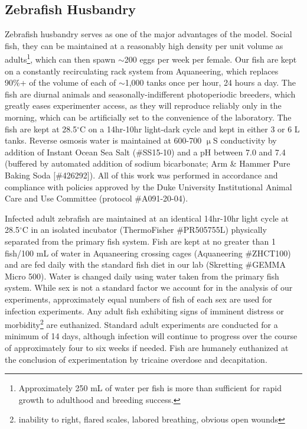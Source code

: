 \subsection{Zebrafish Husbandry}\label{husbandry}

Zebrafish husbandry serves as one of the major advantages of the model. Social fish, they can be maintained at a reasonably high density per unit volume as adults\footnote{Approximately 250 mL of water per fish is more than sufficient for rapid growth to adulthood and breeding success.}, which can then spawn ${\sim}$200 eggs per week per female. Our fish are kept on a constantly recirculating rack system from Aquaneering, which replaces 90\%+ of the volume of each of ${\sim}$1,000 tanks once per hour, 24 hours a day. The fish are diurnal animals and seasonally-indifferent photoperiodic breeders, which greatly eases experimenter access, as they will reproduce reliably only in the morning, which can be artificially set to the convenience of the laboratory. The fish are kept at 28.5$^{\circ}$C on a 14hr\hyp{}10hr light\hyp{}dark cycle and kept in either 3 or 6 L tanks. Reverse osmosis water is maintained at 600\hyp{}700 $\upmu$S conductivity by addition of Instant Ocean Sea Salt (\#SS15\hyp{}10) and a pH between 7.0 and 7.4 (buffered by automated addition of sodium bicarbonate; Arm \& Hammer Pure Baking Soda [\#426292]). All of this work was performed in accordance and compliance with policies approved by the Duke University Institutional Animal Care and Use Committee (protocol \#A091\hyp{}20\hyp{}04).

Infected adult zebrafish are maintained at an identical 14hr\hyp{}10hr light cycle at 28.5$^{\circ}$C in an isolated incubator (ThermoFisher \#PR505755L) physically separated from the primary fish system. Fish are kept at no greater than 1 fish/100 mL of water in Aquaneering crossing cages (Aquaneering \#ZHCT100) and are fed daily with the standard fish diet in our lab (Skretting \#GEMMA Micro 500). Water is changed daily using water taken from the primary fish system. While sex is not a standard factor we account for in the analysis of our experiments, approximately equal numbers of fish of each sex are used for infection experiments. Any adult fish exhibiting signs of imminent distress or morbidity\footnote{inability to right, flared scales, labored breathing, obvious open wounds} are euthanized. Standard adult experiments are conducted for a minimum of 14 days, although infection will continue to progress over the course of approximately four to six weeks if needed. Fish are humanely euthanized at the conclusion of experimentation by tricaine overdose and decapitation.

